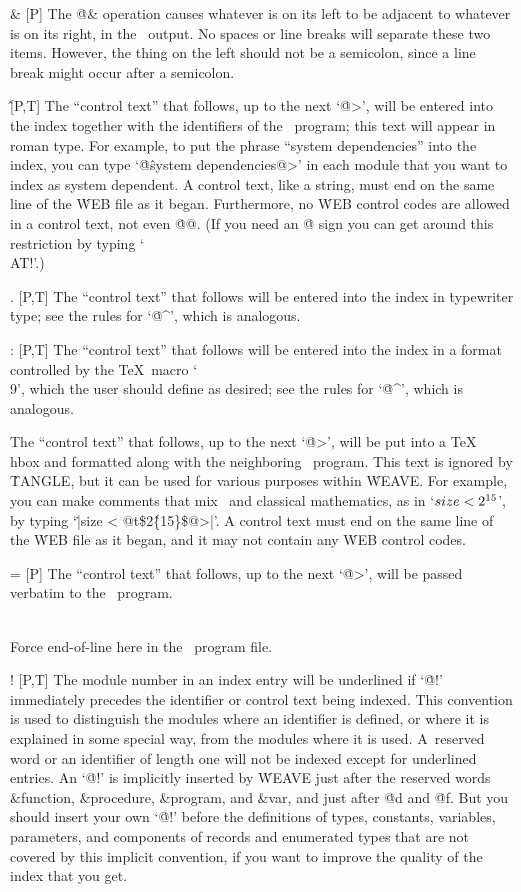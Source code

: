 \@\& [P] The \.{@\&} operation causes whatever is on its left to be
adjacent to whatever is on its right, in the \PASCAL\ output. No spaces or
line breaks will separate these two items. However, the thing on the left
should not be a semicolon, since a line break might occur after a semicolon.

\@\^ [P,T] The ``control text'' that follows, up to the next
`\.{@>}', will be entered into the index together with the identifiers of
the \PASCAL\ program; this text will appear in roman type. For example, to
put the phrase ``system dependencies'' into the index, you can type
`\.{@\^system dependencies@>}' in each module
that you want to index as system dependent. A control text, like a string,
must end on the same line of the \.{WEB} file as it began.  Furthermore,
no \.{WEB} control codes are allowed in a control text, not even
\.{@@}. (If you need an \.{@} sign you can get around this restriction by
typing `\.{\\AT!}'.)

\@. [P,T] The ``control text'' that follows will be entered into the index
in \.{typewriter} \.{type}; see the rules for `\.{@\^}', which is analogous.

\@: [P,T] The ``control text'' that follows will be entered into the index
in a format controlled by the \TeX\ macro `\.{\\9}', which the user
should define as desired; see the rules for `\.{@\^}', which is analogous.

\@t [P] The ``control text'' that follows, up to the next `\.{@>}', will
be put into a \TeX\ \.{\\hbox} and formatted along with the neighboring
\PASCAL\ program. This text is ignored by \.{TANGLE}, but it can be used
for various purposes within \.{WEAVE}. For example, you can make comments
that mix \PASCAL\ and classical mathematics, as in `$\\{size}<2^{15}$', by
typing `\.{|size < @t\$2\^\{15\}\$@>|}'.  A control text must end on the
same line of the \.{WEB} file as it began, and it may not contain any
\.{WEB} control codes.

\@= [P] The ``control text'' that follows, up to the next `\.{@>}', will
be passed verbatim to the \PASCAL\ program.

\@\\ [P] Force end-of-line here in the \PASCAL\ program file.

\@! [P,T] The module number in an index entry will be underlined if `\.{@!}'
immediately precedes the identifier or control text being indexed. This
convention is used to distinguish the modules where an identifier is
defined, or where it is explained in some special way, from the modules
where it is used. A~reserved word or an identifier of length one will not
be indexed except for underlined entries. An `\.{@!}' is implicitly inserted
by \.{WEAVE} just after the reserved words \&{function}, \&{procedure},
\&{program}, and \&{var}, and just after \.{@d} and \.{@f}. But you should
insert your own `\.{@!}' before the definitions of types, constants,
variables, parameters, and components of records and enumerated types that
are not covered by this implicit convention, if you want to improve the
quality of the index that you get.


